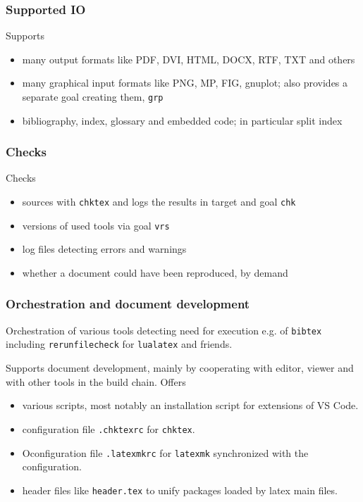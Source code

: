 \begin{frame}
  \frametitle{Supported IO}
  Supports 
  \begin{itemize}
    \item
    many output formats like PDF, DVI, HTML, DOCX, RTF, TXT and others
    \item
    many graphical input formats like PNG, MP, FIG, gnuplot; 
    also provides a separate goal creating them, \texttt{grp} 
    \item
    bibliography, index, glossary and embedded code; in particular split index
  \end{itemize}
\end{frame}


\begin{frame}
  \frametitle{Checks}
  Checks 
  \begin{itemize}
    \item
    sources with \texttt{chktex} and logs the results in target and goal \texttt{chk} 
    \item
    versions of used tools via goal \texttt{vrs} 
    \item
    log files detecting errors and warnings 
    \item
    whether a document could have been reproduced, by demand 
  \end{itemize}
\end{frame}

\begin{frame}
  \frametitle{Orchestration and document development}
  Orchestration of various tools detecting need for execution e.g.
  of \texttt{bibtex} including \texttt{rerunfilecheck} for \texttt{lualatex} and friends.

  Supports document development, mainly by cooperating with editor, viewer and with other tools in the build chain. 
  Offers 
  \begin{itemize}
    \item various scripts, 
    most notably an installation script for extensions of VS Code.
    \item configuration file \texttt{.chktexrc} for \texttt{chktex}.
    \item Oconfiguration file \texttt{.latexmkrc} 
    for \texttt{latexmk} synchronized with the configuration.
    \item header files like \texttt{header.tex} 
    to unify packages loaded by latex main files.
  \end{itemize}
\end{frame}


